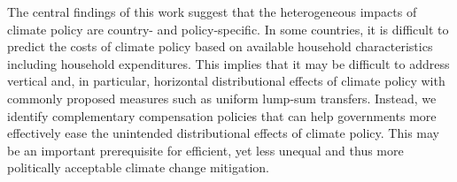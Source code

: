 \documentclass[12pt, a4paper]{article}
\begin{document}
The central findings of this work suggest that the heterogeneous impacts of climate policy are country- and policy-specific. In some countries, it is difficult to predict the costs of climate policy based on available household characteristics including household expenditures. This implies that it may be difficult to address vertical and, in particular, horizontal distributional effects of climate policy with commonly proposed measures such as uniform lump-sum transfers. Instead, we identify complementary compensation policies that can help governments more effectively ease the unintended distributional effects of climate policy. This may be an important prerequisite for efficient, yet less unequal and thus more politically acceptable climate change mitigation. 

\clearpage

\begin{refcontext}[sorting=nyt]
\printbibliography
\end{refcontext}

\clearpage
\end{document}
